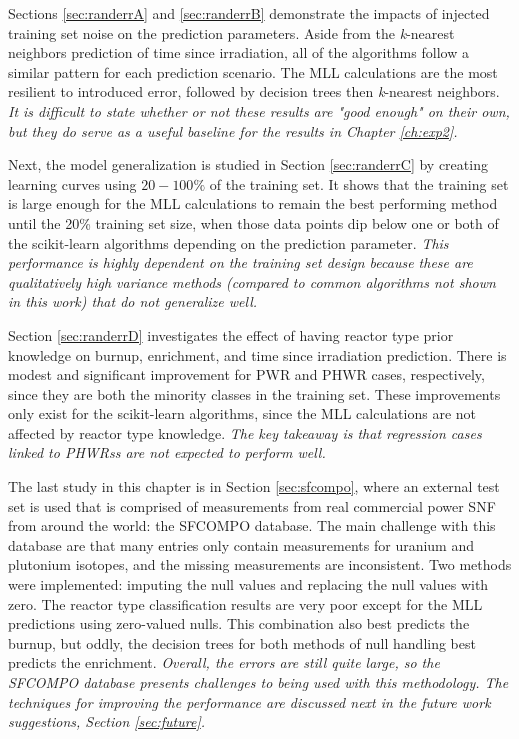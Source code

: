 Sections \ref{sec:randerrA} and \ref{sec:randerrB} demonstrate the impacts of
injected training set noise on the prediction parameters. Aside from the
\textit{k}-nearest neighbors prediction of time since irradiation, all of the
algorithms follow a similar pattern for each prediction scenario.  The
\gls{MLL} calculations are the most resilient to introduced error, followed by
decision trees then \textit{k}-nearest neighbors.  \textit{It is difficult to
state whether or not these results are "good enough" on their own, but they do
serve as a useful baseline for the results in Chapter \ref{ch:exp2}.} 

Next, the model generalization is studied in Section \ref{sec:randerrC} by
creating learning curves using $20-100\%$ of the training set.  It shows that
the training set is large enough for the \gls{MLL} calculations to remain the
best performing method until the 20\% training set size, when those data points
dip below one or both of the scikit-learn algorithms depending on the
prediction parameter.  \textit{This performance is highly dependent on the
training set design because these are qualitatively high variance methods
(compared to common algorithms not shown in this work) that do not generalize
well.}

Section \ref{sec:randerrD} investigates the effect of having reactor type prior
knowledge on burnup, enrichment, and time since irradiation prediction.  There
is modest and significant improvement for \gls{PWR} and \gls{PHWR} cases,
respectively, since they are both the minority classes in the training set.
These improvements only exist for the scikit-learn algorithms, since the
\gls{MLL} calculations are not affected by reactor type knowledge. \textit{The
key takeaway is that regression cases linked to \glspl{PHWR}s are not expected
to perform well.}

The last study in this chapter is in Section \ref{sec:sfcompo}, where an
external test set is used that is comprised of measurements from real
commercial power \gls{SNF} from around the world: the \gls{SFCOMPO} database.
The main challenge with this database are that many entries only contain
measurements for uranium and plutonium isotopes, and the missing measurements
are inconsistent. Two methods were implemented: imputing the null values and
replacing the null values with zero.  The reactor type classification results
are very poor except for the \gls{MLL} predictions using zero-valued nulls.
This combination also best predicts the burnup, but oddly, the decision trees
for both methods of null handling best predicts the enrichment.
\textit{Overall, the errors are still quite large, so the \gls{SFCOMPO}
database presents challenges to being used with this methodology. The
techniques for improving the performance are discussed next in the future work
suggestions, Section \ref{sec:future}.}

